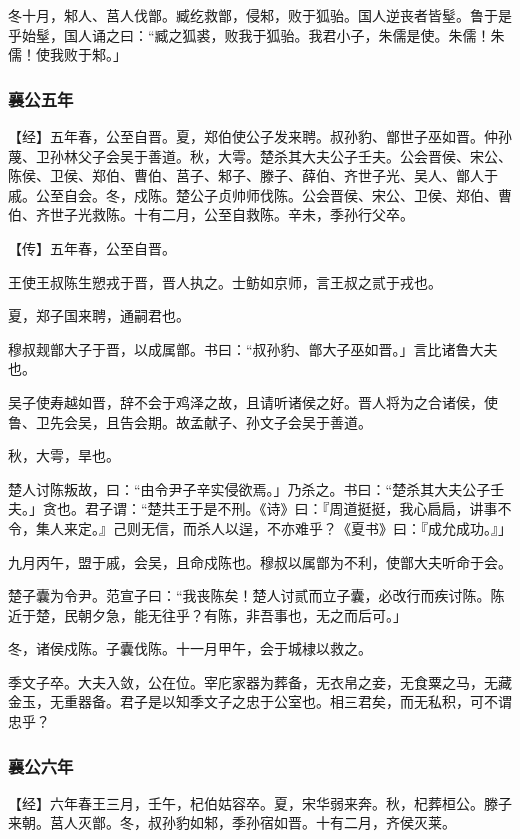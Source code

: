 \documentclass[]{article}
\begin{document}
冬十月，邾人、莒人伐鄫。臧纥救鄫，侵邾，败于狐骀。国人逆丧者皆髽。鲁于是乎始髽，国人诵之曰：``臧之狐裘，败我于狐骀。我君小子，朱儒是使。朱儒！朱儒！使我败于邾。」

\hypertarget{header-n1860}{%
\subsubsection{襄公五年}\label{header-n1860}}

【经】五年春，公至自晋。夏，郑伯使公子发来聘。叔孙豹、鄫世子巫如晋。仲孙蔑、卫孙林父子会吴于善道。秋，大雩。楚杀其大夫公子壬夫。公会晋侯、宋公、陈侯、卫侯、郑伯、曹伯、莒子、邾子、滕子、薛伯、齐世子光、吴人、鄫人于戚。公至自会。冬，戍陈。楚公子贞帅师伐陈。公会晋侯、宋公、卫侯、郑伯、曹伯、齐世子光救陈。十有二月，公至自救陈。辛未，季孙行父卒。

【传】五年春，公至自晋。

王使王叔陈生愬戎于晋，晋人执之。士鲂如京师，言王叔之贰于戎也。

夏，郑子国来聘，通嗣君也。

穆叔觌鄫大子于晋，以成属鄫。书曰：``叔孙豹、鄫大子巫如晋。」言比诸鲁大夫也。

吴子使寿越如晋，辞不会于鸡泽之故，且请听诸侯之好。晋人将为之合诸侯，使鲁、卫先会吴，且告会期。故孟献子、孙文子会吴于善道。

秋，大雩，旱也。

楚人讨陈叛故，曰：``由令尹子辛实侵欲焉。」乃杀之。书曰：``楚杀其大夫公子壬夫。」贪也。君子谓：``楚共王于是不刑。《诗》曰：『周道挺挺，我心扃扃，讲事不令，集人来定。』己则无信，而杀人以逞，不亦难乎？《夏书》曰：『成允成功。』」

九月丙午，盟于戚，会吴，且命戍陈也。穆叔以属鄫为不利，使鄫大夫听命于会。

楚子囊为令尹。范宣子曰：``我丧陈矣！楚人讨贰而立子囊，必改行而疾讨陈。陈近于楚，民朝夕急，能无往乎？有陈，非吾事也，无之而后可。」

冬，诸侯戍陈。子囊伐陈。十一月甲午，会于城棣以救之。

季文子卒。大夫入敛，公在位。宰庀家器为葬备，无衣帛之妾，无食粟之马，无藏金玉，无重器备。君子是以知季文子之忠于公室也。相三君矣，而无私积，可不谓忠乎？

\hypertarget{header-n1875}{%
\subsubsection{襄公六年}\label{header-n1875}}

【经】六年春王三月，壬午，杞伯姑容卒。夏，宋华弱来奔。秋，杞葬桓公。滕子来朝。莒人灭鄫。冬，叔孙豹如邾，季孙宿如晋。十有二月，齐侯灭莱。
\end{document}
